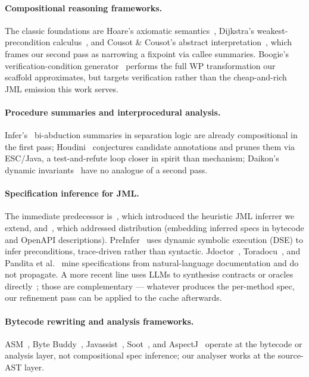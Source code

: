 \paragraph{Compositional reasoning frameworks.}
The classic foundations are Hoare's axiomatic semantics~\cite{hoare1969axiomatic}, Dijkstra's weakest-precondition calculus~\cite{dijkstra_guarded_1975,dijkstra1976discipline}, and Cousot \& Cousot's abstract interpretation~\cite{cousot1977abstract}, which frames our second pass as narrowing a fixpoint via callee summaries. Boogie's verification-condition generator~\cite{barnett2005weakest} performs the full WP transformation our scaffold approximates, but targets verification rather than the cheap-and-rich JML emission this work serves.

\paragraph{Procedure summaries and interprocedural analysis.}
Infer's~\cite{calcagno2015infer} bi-abduction summaries in separation
logic are already compositional in the first pass;
Houdini~\cite{flanagan2001houdini} conjectures candidate annotations
and prunes them via ESC/Java, a test-and-refute loop closer in spirit
than mechanism; Daikon's dynamic invariants~\cite{ernst2007daikon}
have no analogue of a second pass.

\paragraph{Specification inference for JML.}
The immediate predecessor is~\cite{edmonds2026inference}, which introduced the heuristic JML inferrer we extend, and~\cite{edmonds2026embedding}, which addressed distribution (embedding inferred specs in bytecode and OpenAPI descriptions). PreInfer~\cite{preinfer2017} uses dynamic symbolic execution (DSE) to infer preconditions, trace-driven rather than syntactic. Jdoctor~\cite{jdoctor2018}, Toradocu~\cite{toradocu2016}, and Pandita et al.~\cite{pandita2012inferring} mine specifications from natural-language documentation and do not propagate. A more recent line uses LLMs to synthesise contracts or oracles directly~\cite{endres2024can,ma2024specgen,richter2025beyondpostconditions,konstantinou2024oracles}; those are complementary --- whatever produces the per-method spec, our refinement pass can be applied to the cache afterwards.

\paragraph{Bytecode rewriting and analysis frameworks.}
ASM~\cite{asm}, Byte Buddy~\cite{bytebuddy}, Javassist~\cite{chiba2000javassist}, Soot~\cite{vallee1999soot}, and AspectJ~\cite{kiczales1997aspectj} operate at the bytecode or analysis layer, not compositional spec inference; our analyser works at the source-AST layer.

